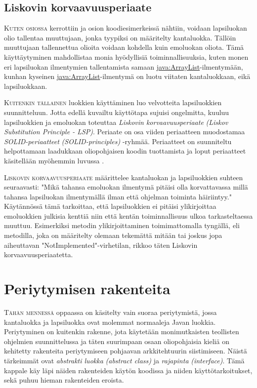 \documentclass[openany]{book}
\newcommand{\newthought}[1]{\smallskip\textsc{#1}}
\newcommand{\eng}[1]{\textit{(#1)}}
\newcommand{\new}[1]{\textit{\gls{#1}}}
\newcommand{\neweng}[2]{\new{#1} \eng{#2}}
\newcommand{\java}[1]{\underline{\gls{java:#1}}}
\begin{document}
\subsection{Liskovin korvaavuusperiaate}
\label{LSP}

\newthought{Kuten osiossa}  kerrottiin ja osion 
koodiesimerkeissä nähtiin, voidaan lapsiluokan olio tallentaa muuttujaan, jonka tyypiksi on
määritelty kantaluokka. Tällöin muuttujaan tallennettua olioita voidaan kohdella kuin emoluokan
oliota. Tämä käyttäytyminen mahdollistaa monia hyödyllisiä toiminnallisuuksia, kuten monen eri
lapsiluokan ilmentymien tallentamista samaan \java{ArrayList}-ilmentymään, kunhan kyseinen
\java{ArrayList}-ilmentymä on luotu viitaten kantaluokkaan, eikä lapsiluokkaan.

\newthought{Kuitenkin tällainen} luokkien käyttäminen luo velvotteita lapsiluokkien suunnitteluun.
Jotta edellä kuvailtu käyttötapa sujuisi ongelmitta, kuuluu lapsiluokkien ja emoluokan toteuttaa
\neweng{Liskovin korvaavuusperiaate}{Liskov Substitution Principle - LSP}. Periaate on osa
viiden periaatteen muodostamaa \neweng{SOLID-periaatteet}{SOLID-principles} -ryhmää. Periaatteet
on suunniteltu helpottamaan laadukkaan oliopohjaisen koodin tuottamista ja loput periaatteet
käsitellään myöhemmin luvussa .

\newthought{\Gls{Liskovin korvaavuusperiaate}} määrittelee kantaluokan ja lapsiluokkien suhteen
seuraavasti: "Mikä tahansa emoluokan ilmentymä pitäisi olla korvattavassa millä tahansa 
lapsiluokan ilmentymällä ilman että ohjelman toiminta häiriintyy." Käytännössä tämä tarkoittaa,
että lapsiluokkien ei pitäisi ylikirjoittaa emoluokkien julkisia kenttiä niin että kentän
toiminnallisuus ulkoa tarkasteltaessa muuttuu. Esimerkiksi metodin ylikirjoittaminen
toimimattomalla tyngällä, eli metodilla, joka on määritelty olemaan tekemättä mitään tai joskus
jopa aiheuttavan "NotImplemented"-virhetilan, rikkoo täten Liskovin korvaavuusperiaatetta.


\section{Periytymisen rakenteita}
\label{periytyminen5}

\newthought{Tähän mennessä} oppaassa on käsitelty vain suoraa periytymistä, jossa
\gls{kantaluokka} ja \gls{lapsiluokka} ovat molemmat normaaleja Javan luokkia. Periytyminen on
kuitenkin rakenne, jota käytetään monimutkaisten teollisten ohjelmien suunnittelussa ja täten
suurimpaan osaan oliopohjaisia kieliä on kehitetty rakenteita periytymiseen pohjaavan
arkkitehtuurin siistimiseen. Näistä tärkeimmät ovat \neweng{abstrakti luokka}{abstract class} ja
\neweng{rajapinta}{interface}. Tämä kappale käy läpi näiden rakenteiden käytön koodissa ja niiden
käyttötarkoitukset, sekä puhuu hieman rakenteiden eroista.
\end{document}
